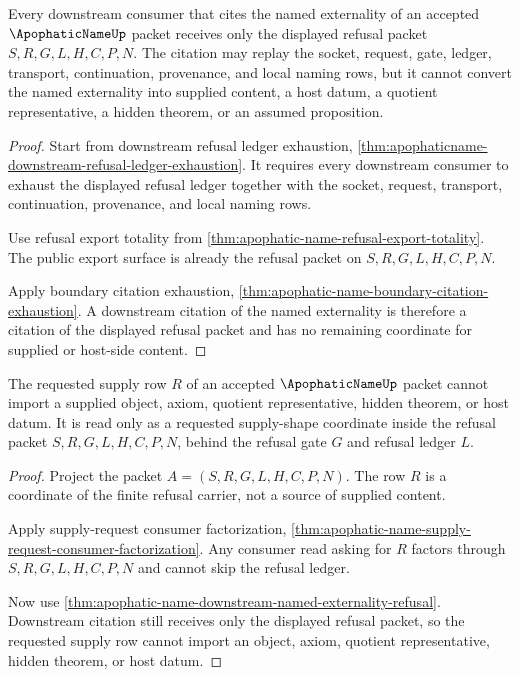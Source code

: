 \begin{theorem}
\label{thm:apophatic-name-downstream-named-externality-refusal}
Every downstream consumer that cites the named externality of an accepted $\ApophaticNameUp$ packet receives only the displayed refusal packet $S,R,G,L,H,C,P,N$. The citation may replay the socket, request, gate, ledger, transport, continuation, provenance, and local naming rows, but it cannot convert the named externality into supplied content, a host datum, a quotient representative, a hidden theorem, or an assumed proposition.
\end{theorem}
\begin{proof}
Start from downstream refusal ledger exhaustion, \autoref{thm:apophaticname-downstream-refusal-ledger-exhaustion}. It requires every downstream consumer to exhaust the displayed refusal ledger together with the socket, request, transport, continuation, provenance, and local naming rows.

Use refusal export totality from \autoref{thm:apophatic-name-refusal-export-totality}. The public export surface is already the refusal packet on $S,R,G,L,H,C,P,N$.

Apply boundary citation exhaustion, \autoref{thm:apophatic-name-boundary-citation-exhaustion}. A downstream citation of the named externality is therefore a citation of the displayed refusal packet and has no remaining coordinate for supplied or host-side content.
\end{proof}

\begin{theorem}
\label{thm:apophatic-name-supply-request-nonimport}
The requested supply row $R$ of an accepted $\ApophaticNameUp$ packet cannot import a supplied object, axiom, quotient representative, hidden theorem, or host datum. It is read only as a requested supply-shape coordinate inside the refusal packet $S,R,G,L,H,C,P,N$, behind the refusal gate $G$ and refusal ledger $L$.
\end{theorem}
\begin{proof}
Project the packet $A=(S,R,G,L,H,C,P,N)$. The row $R$ is a coordinate of the finite refusal carrier, not a source of supplied content.

Apply supply-request consumer factorization, \autoref{thm:apophatic-name-supply-request-consumer-factorization}. Any consumer read asking for $R$ factors through $S,R,G,L,H,C,P,N$ and cannot skip the refusal ledger.

Now use \autoref{thm:apophatic-name-downstream-named-externality-refusal}. Downstream citation still receives only the displayed refusal packet, so the requested supply row cannot import an object, axiom, quotient representative, hidden theorem, or host datum.
\end{proof}

